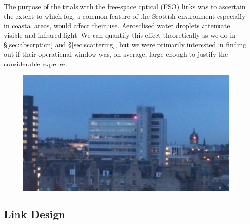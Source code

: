 The purpose of the trials with the free-space optical (FSO) links was to
ascertain the extent to which fog, a common feature of the Scottish
environment especially in coastal areas, would affect their
use. Aerosolised water droplets attenuate visible and infrared
light. We can quantify this effect theoretically as we do in
\S\ref{sec:absorption} and \S\ref{sec:scattering}, but we were
primarily interested in finding out if their operational window was,
on average, large enough to justify the considerable expense.
\begin{figure}
  \includegraphics[width=\textwidth]{at-laser.jpg}
\end{figure}

\subsection{Link Design}
\label{sec:link-design}

